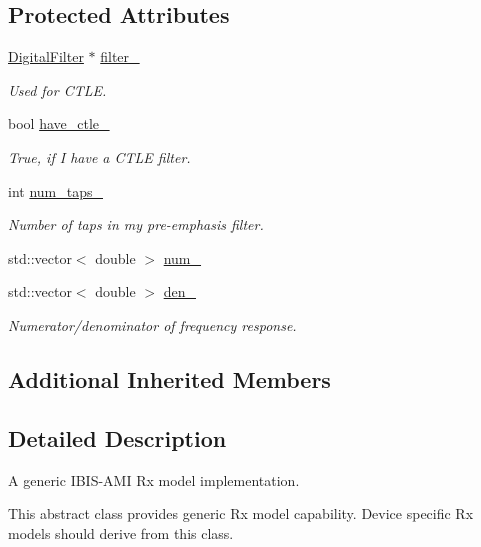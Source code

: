 \subsection*{Protected Attributes}
\begin{DoxyCompactItemize}
\item 
\hyperlink{class_digital_filter}{Digital\+Filter} $\ast$ \hyperlink{class_ami_rx_aa3e0caabcdfa0c97620a0d17cf6b559f}{filter\+\_\+}
\begin{DoxyCompactList}\small\item\em Used for C\+T\+L\+E. \end{DoxyCompactList}\item 
bool \hyperlink{class_ami_rx_ae2840175da78615711e175b9f5019087}{have\+\_\+ctle\+\_\+}
\begin{DoxyCompactList}\small\item\em True, if I have a C\+T\+L\+E filter. \end{DoxyCompactList}\item 
int \hyperlink{class_ami_rx_a3e41b1552492931a0da2ada55d894f82}{num\+\_\+taps\+\_\+}
\begin{DoxyCompactList}\small\item\em Number of taps in my pre-\/emphasis filter. \end{DoxyCompactList}\item 
std\+::vector$<$ double $>$ \hyperlink{class_ami_rx_aae9534ddd94ec489921ee1ebb534e38b}{num\+\_\+}
\item 
std\+::vector$<$ double $>$ \hyperlink{class_ami_rx_a9409edcb278ad096873c32df764f8939}{den\+\_\+}
\begin{DoxyCompactList}\small\item\em Numerator/denominator of frequency response. \end{DoxyCompactList}\end{DoxyCompactItemize}
\subsection*{Additional Inherited Members}


\subsection{Detailed Description}
A generic I\+B\+I\+S-\/\+A\+M\+I Rx model implementation. 

This abstract class provides generic Rx model capability. Device specific Rx models should derive from this class. 

